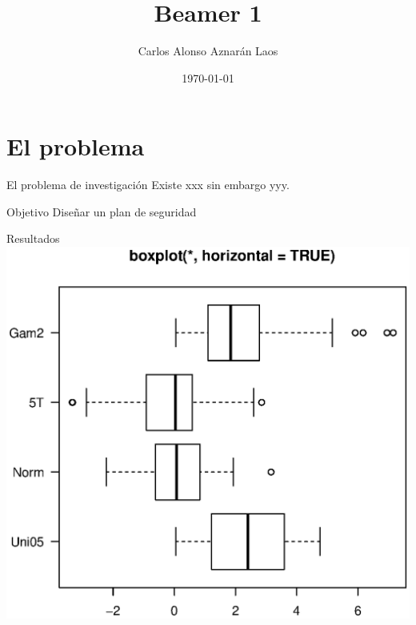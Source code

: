 \documentclass[11pt]{beamer}
\author{Carlos Alonso Aznarán Laos}
\title{Beamer 1}
\institute{Universidad Nacional de Ingeniería}
\date{\today}
\begin{document}
\begin{frame} %
\titlepage
\end{frame}

\begin{frame}
\tableofcontents %
\end{frame}
\section{El problema}
\begin{frame}{El problema de investigación}
Existe xxx sin embargo yyy.
\end{frame}

\begin{frame}{Objetivo}
Diseñar un plan de seguridad %
\end{frame}

\begin{frame}{Resultados}
\includegraphics[scale=0.5]{boxplot}

\end{frame}
\end{document}
